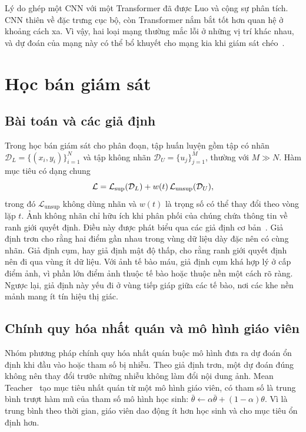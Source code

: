 Lý do ghép một CNN với một Transformer đã được Luo và cộng sự phân tích. CNN thiên về đặc trưng cục bộ, còn Transformer nắm bắt tốt hơn quan hệ ở khoảng cách xa. Vì vậy, hai loại mạng thường mắc lỗi ở những vị trí khác nhau, và dự đoán của mạng này có thể bổ khuyết cho mạng kia khi giám sát chéo~\cite{luo2022ctct}.

\section{Học bán giám sát}
\label{sec:ssl}

\subsection{Bài toán và các giả định}

Trong học bán giám sát cho phân đoạn, tập huấn luyện gồm tập có nhãn $\mathcal{D}_L=\{(x_i,y_i)\}_{i=1}^{N}$ và tập không nhãn $\mathcal{D}_U=\{u_j\}_{j=1}^{M}$, thường với $M\gg N$. Hàm mục tiêu có dạng chung
\begin{equation}
  \mathcal{L} = \mathcal{L}_{\mathrm{sup}}(\mathcal{D}_L) + w(t)\,\mathcal{L}_{\mathrm{unsup}}(\mathcal{D}_U),
  \label{eq:ssl}
\end{equation}
trong đó $\mathcal{L}_{\mathrm{unsup}}$ không dùng nhãn và $w(t)$ là trọng số có thể thay đổi theo vòng lặp $t$. Ảnh không nhãn chỉ hữu ích khi phân phối của chúng chứa thông tin về ranh giới quyết định. Điều này được phát biểu qua các giả định cơ bản~\cite{chapelle2006ssl,vanengelen2020survey}. Giả định trơn cho rằng hai điểm gần nhau trong vùng dữ liệu dày đặc nên có cùng nhãn. Giả định cụm, hay giả định mật độ thấp, cho rằng ranh giới quyết định nên đi qua vùng ít dữ liệu. Với ảnh tế bào máu, giả định cụm khá hợp lý ở cấp điểm ảnh, vì phần lớn điểm ảnh thuộc tế bào hoặc thuộc nền một cách rõ ràng. Ngược lại, giả định này yếu đi ở vùng tiếp giáp giữa các tế bào, nơi các khe nền mảnh mang ít tín hiệu thị giác.

\subsection{Chính quy hóa nhất quán và mô hình giáo viên}

Nhóm phương pháp chính quy hóa nhất quán buộc mô hình đưa ra dự đoán ổn định khi đầu vào hoặc tham số bị nhiễu. Theo giả định trơn, một dự đoán đúng không nên thay đổi trước những nhiễu không làm đổi nội dung ảnh. Mean Teacher~\cite{tarvainen2017mt} tạo mục tiêu nhất quán từ một mô hình giáo viên, có tham số là trung bình trượt hàm mũ của tham số mô hình học sinh: $\bar\theta \leftarrow \alpha\bar\theta + (1-\alpha)\theta$. Vì là trung bình theo thời gian, giáo viên dao động ít hơn học sinh và cho mục tiêu ổn định hơn.

